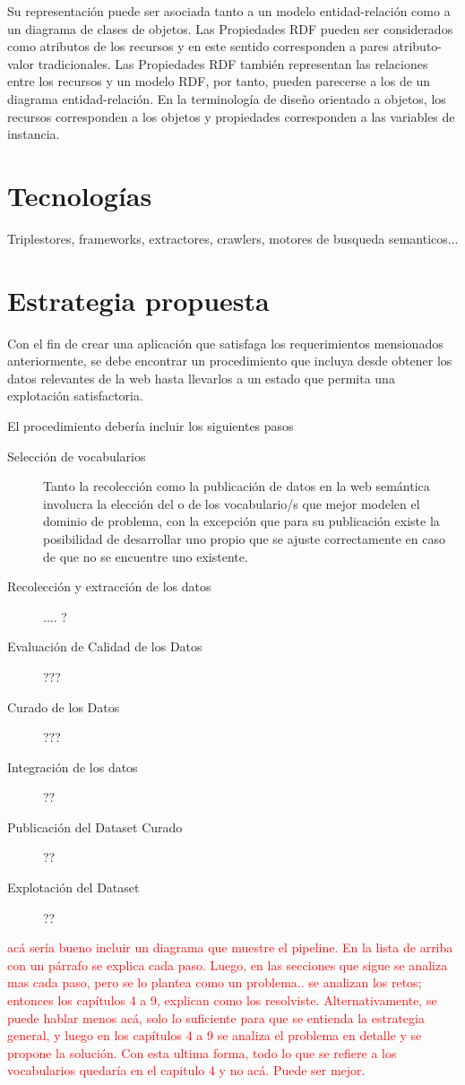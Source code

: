Su representación puede ser asociada tanto a un modelo entidad-relación como a un diagrama de clases de objetos.
Las Propiedades RDF pueden ser considerados como atributos de los recursos y en este sentido corresponden a pares 
atributo-valor tradicionales. Las Propiedades RDF también representan las relaciones entre los recursos y un modelo RDF​​, 
por tanto, pueden parecerse a los de un diagrama entidad-relación.
En la terminología de diseño orientado a objetos, los recursos corresponden a los objetos y propiedades 
corresponden a las variables de instancia.



\section{Tecnologías}
Triplestores, frameworks, extractores, crawlers, motores de busqueda semanticos...

\section{Estrategia propuesta}
Con el fin de crear una aplicación que satisfaga los requerimientos mensionados anteriormente, se debe encontrar
un procedimiento que incluya desde obtener los datos relevantes de la web hasta llevarlos a un estado que permita una 
explotación satisfactoria. 

El procedimiento debería incluir los siguientes pasos  

\begin{description}
\item[Selección de vocabularios ] Tanto la recolección como la publicación de datos en la web semántica involucra la elección del o de los vocabulario/s que mejor modelen el dominio de problema, con la excepción que para su publicación existe la posibilidad de desarrollar uno propio que se ajuste correctamente en caso de que no se encuentre uno existente. 
\item[Recolección y extracción de los datos ] .... ?
\item[Evaluación de Calidad de los Datos] ???
\item[Curado de los Datos] ???
\item[Integración de los datos] ?? 
\item[Publicación del Dataset Curado] ?? 
\item[Explotación del Dataset] ?? 
\end{description}

\begin{framed}
\textcolor{red}{acá sería bueno incluir un diagrama que muestre el pipeline. En la lista de arriba con un párrafo se explica cada paso. Luego, en las secciones que sigue se analiza mas cada paso, pero se lo plantea como un problema.. se analizan los retos; entonces los capítulos 4 a 9, explican como los resolviste. Alternativamente, se puede hablar menos acá, solo lo suficiente para que se entienda la estrategia general, y luego en los capítulos 4 a 9 se analiza el problema en detalle y se propone la solución. Con esta ultima forma, todo lo que se refiere a los vocabularios quedaría en el capitulo 4 y no acá. Puede ser mejor.}
\end{framed}


